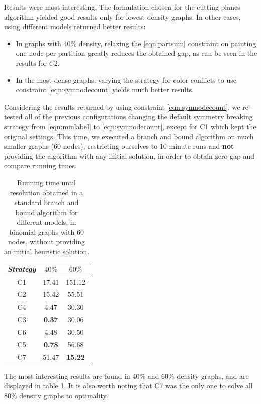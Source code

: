 Results were most interesting. The formulation chosen for the cutting planes algorithm yielded good results only for lowest density graphs. In other cases, using different models returned better results:
\begin{itemize}
\item In graphs with $40\%$ density, relaxing the \ref{eqn:partsum} constraint on painting one node per partition greatly reduces the obtained gap, as can be seen in the results for $C2$.
\item In the most dense graphs, varying the strategy for color conflicts to use constraint \ref{eqn:symnodecount} yields much better results.
\end{itemize}

Considering the results returned by using constraint \ref{eqn:symnodecount}, we re-tested all of the previous configurations changing the default symmetry breaking strategy from \ref{eqn:minlabel} to \ref{eqn:symnodecount}, except for C1 which kept the original settings. This time, we executed a branch and bound algorithm on much smaller graphs (60 nodes), restricting ourselves to 10-minute runs and \textbf{not} providing the algorithm with any initial solution, in order to obtain zero gap and compare running times.

\begin{table}
\centering

\begin{tabular}{|c|c|c|}
\hline
\textit{Strategy} & {$40\%$} & {$60\%$}
\\
\hline
C1 & 17.41 & 151.12
\\
C2 & 15.42 & 55.51
\\
C4 & 4.47 & 30.30
\\
C3 & \textbf{0.37} & 30.06
\\
C6 & 4.48 & 30.50
\\
C5 & \textbf{0.78} & 56.68
\\
C7 & 51.47 & \textbf{15.22}
\\
\hline 
 \end{tabular}

\caption{Running time until resolution obtained in a standard branch and bound algorithm for different models, in binomial graphs with 60 nodes, without providing an initial heuristic solution.}
\label{table:models:bnb60}

\end{table}

The most interesting results are found in $40\%$ and $60\%$ density graphs, and are displayed in table \ref{table:models:bnb60}. It is also worth noting that C7 was the only one to solve all $80\%$ density graphs to optimality.


